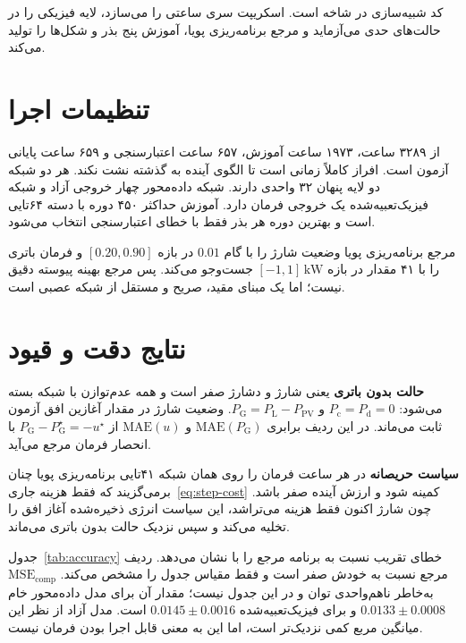 کد شبیه‌سازی در شاخه  است. اسکریپت  سری ساعتی را می‌سازد،  لایه فیزیکی را در حالت‌های حدی می‌آزماید و  مرجع برنامه‌ریزی پویا، آموزش پنج بذر و شکل‌ها را تولید می‌کند.

\section{تنظیمات اجرا}
از ۳۲۸۹ ساعت، ۱۹۷۳ ساعت آموزش، ۶۵۷ ساعت اعتبارسنجی و ۶۵۹ ساعت پایانی آزمون است. افراز کاملاً زمانی است تا الگوی آینده به گذشته نشت نکند. هر دو شبکه دو لایه پنهان ۳۲ واحدی دارند. شبکه داده‌محور چهار خروجی آزاد و شبکه فیزیک‌تعبیه‌شده یک خروجی فرمان دارد. آموزش حداکثر ۴۵۰ دوره با دسته ۶۴تایی است و بهترین دوره هر بذر فقط با خطای اعتبارسنجی انتخاب می‌شود.

مرجع برنامه‌ریزی پویا وضعیت شارژ را با گام $0{.}01$ در بازه $[0{.}20,0{.}90]$ و فرمان باتری را با ۴۱ مقدار در بازه $[-1,1]\,\mathrm{kW}$ جست‌وجو می‌کند. پس مرجع بهینه پیوسته دقیق نیست؛ اما یک مبنای مقید، صریح و مستقل از شبکه عصبی است.

\section{نتایج دقت و قیود}
\textbf{حالت بدون باتری} یعنی شارژ و دشارژ صفر است و همه عدم‌توازن با شبکه بسته می‌شود: $P_{\mathrm{c}}=P_{\mathrm{d}}=0$ و $P_{\mathrm{G}}=P_{\mathrm{L}}-P_{\mathrm{PV}}$. وضعیت شارژ در مقدار آغازین افق آزمون ثابت می‌ماند. در این ردیف برابری $\mathrm{MAE}(P_{\mathrm{G}})$ و $\mathrm{MAE}(u)$ از $P_{\mathrm{G}}-P_{\mathrm{G}}^{\star}=-u^{\star}$ با انحصار فرمان مرجع می‌آید.

\textbf{سیاست حریصانه} در هر ساعت فرمان را روی همان شبکه ۴۱تایی برنامه‌ریزی پویا چنان برمی‌گزیند که فقط هزینه جاری~\eqref{eq:step-cost} کمینه شود و ارزش آینده صفر باشد. چون شارژ اکنون فقط هزینه می‌تراشد، این سیاست انرژی ذخیره‌شده آغاز افق را تخلیه می‌کند و سپس نزدیک حالت بدون باتری می‌ماند.

جدول~\ref{tab:accuracy} خطای تقریب نسبت به برنامه مرجع را با  نشان می‌دهد. ردیف مرجع نسبت به خودش صفر است و فقط مقیاس جدول را مشخص می‌کند. $\mathrm{MSE}_{\mathrm{comp}}$ به‌خاطر ناهم‌واحدی توان و  در این جدول نیست؛ مقدار آن برای مدل داده‌محور خام $0{.}0133\pm 0{.}0008$ و برای فیزیک‌تعبیه‌شده $0{.}0145\pm 0{.}0016$ است. مدل آزاد از نظر این میانگین مربع کمی نزدیک‌تر است، اما این به معنی قابل اجرا بودن فرمان نیست.

